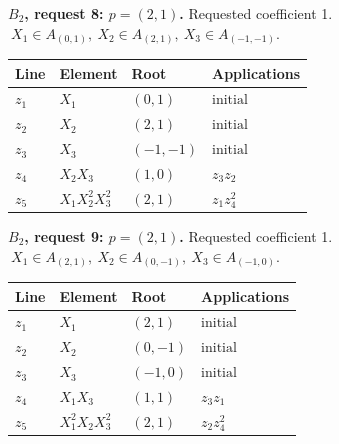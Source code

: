 \par\medskip\noindent\begin{minipage}{\textwidth}
\textbf{\(B_2\), request 8: \(p=(2,1)\).} Requested coefficient 1.
\(\ X_1\in A_{(0,1)},\ X_2\in A_{(2,1)},\ X_3\in A_{(-1,-1)}.\)\par
\smallskip\centering\small\begin{tabular}{@{}llll@{}}\toprule
Line & Element & Root & Applications\\\midrule
\(z_{1}\) & \(X_1\) & \((0,1)\) & \(\text{initial}\) \\
\(z_{2}\) & \(X_2\) & \((2,1)\) & \(\text{initial}\) \\
\(z_{3}\) & \(X_3\) & \((-1,-1)\) & \(\text{initial}\) \\
\(z_{4}\) & \(X_2X_3\) & \((1,0)\) & \(z_{3}z_{2}\) \\
\(z_{5}\) & \(X_1X_2^{2}X_3^{2}\) & \((2,1)\) & \(z_{1}z_{4}^{2}\) \\
\bottomrule\end{tabular}\end{minipage}\par
\par\medskip\noindent\begin{minipage}{\textwidth}
\textbf{\(B_2\), request 9: \(p=(2,1)\).} Requested coefficient 1.
\(\ X_1\in A_{(2,1)},\ X_2\in A_{(0,-1)},\ X_3\in A_{(-1,0)}.\)\par
\smallskip\centering\small\begin{tabular}{@{}llll@{}}\toprule
Line & Element & Root & Applications\\\midrule
\(z_{1}\) & \(X_1\) & \((2,1)\) & \(\text{initial}\) \\
\(z_{2}\) & \(X_2\) & \((0,-1)\) & \(\text{initial}\) \\
\(z_{3}\) & \(X_3\) & \((-1,0)\) & \(\text{initial}\) \\
\(z_{4}\) & \(X_1X_3\) & \((1,1)\) & \(z_{3}z_{1}\) \\
\(z_{5}\) & \(X_1^{2}X_2X_3^{2}\) & \((2,1)\) & \(z_{2}z_{4}^{2}\) \\
\bottomrule\end{tabular}\end{minipage}\par
